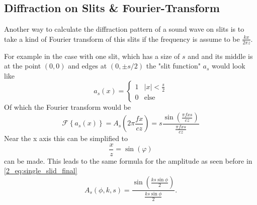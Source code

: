 \subsection{Diffraction on Slits \& Fourier-Transform}\label{2_Acoustics_sec:diffraction_fourier}
Another way to calculate the diffraction pattern of a sound wave on slits is to take a kind of Fourier transform of this slits if the frequency is assume to be $\frac{k x}{2 \pi z}$.

For example in the case with one slit, which has a size of $s$ and and its middle is at the point $(0,0)$ and edges at $(0,\pm s/2)$ the "slit function" $a_s$ would look like
\begin{equation}
     a_s(x) =
    \begin{cases}
      1 & \text{$|x| < \frac{s}{2}$}\\
      0 & \text{else}
     \end{cases}
\end{equation}
Of which the Fourier transform would be
\begin{equation}
    \mathcal{F}\left \{ a_s(x) \right \} = A_s\left ( 2\pi\frac{f x}{c z} \right ) = s\frac{\sin{\left(  \frac{\pi f x s}{c z} \right )}}{\frac{\pi f x s}{c z}} 
\end{equation}
Near the x axis this can be simplified to
\begin{equation}
    \frac{x}{z} = \sin{(\varphi)}
\end{equation}
can be made. This leads to the same formula for the amplitude as seen before in \ref{2_eq:single_slid_final}
\begin{equation}
    A_s(\phi, k, s) = \frac{\sin \left ( \frac{ks \sin \phi}{2}\right )}{ \frac{ks \sin \phi}{2}}.
\end{equation}
